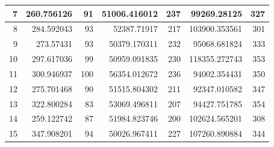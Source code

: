 \begin{table}
\begin{adjustwidth}{}{}
{{\begin{tabular}{|r|r|r|r|r|r|r|}
\hline
7                                          & 260.756126                   & 91                                    & 51006.416012                   & 237                                   & 99269.28125                  & 327                                    \\ 
\hline
8                                          & 284.592043                   & 93                                    & 52387.71917                    & 217                                   & 103900.353561                & 301                                    \\ 
\hline
9                                          & 273.57431                    & 93                                    & 50379.170311                   & 232                                   & 95068.681824                 & 333                                    \\ 
\hline
10                                         & 297.617036                   & 99                                    & 50959.091835                   & 230                                   & 118355.272743                & 353                                    \\ 
\hline
11                                         & 300.946937                   & 100                                   & 56354.012672                   & 236                                   & 94002.354431                 & 350                                    \\ 
\hline
12                                         & 275.701468                   & 90                                    & 51515.804302                   & 211                                   & 92347.010582                 & 347                                    \\ 
\hline
13                                         & 322.800284                   & 83                                    & 53069.496811                   & 207                                   & 94427.751785                 & 354                                    \\ 
\hline
14                                         & 259.122742                   & 87                                    & 51984.823746                   & 200                                   & 102624.565201                & 308                                    \\ 
\hline
15                                         & 347.908201                   & 94                                    & 50026.967411                   & 227                                   & 107260.890884                & 344                                    \\ 

\end{tabular}}}
\end{adjustwidth}
\end{table}
